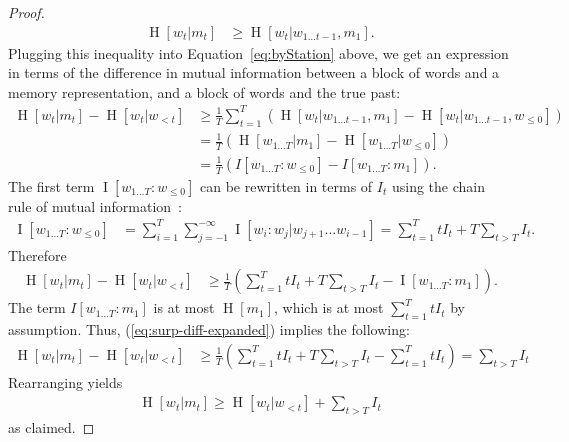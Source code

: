 \documentclass[11pt,letterpaper]{article}
\begin{document}
\begin{proof}
\begin{align}
\operatorname{H}[w_t | m_t]& \geq \operatorname{H}[w_t|w_{1\dots t-1}, m_1]. 
\end{align}
Plugging this inequality into Equation~\ref{eq:byStation} above, we get an expression in terms of the difference in mutual information between a block of words and a memory representation, and a block of words and the true past:
\begin{align}\label{eq:plugged}
\operatorname{H}[w_t | m_t] - \operatorname{H}[w_t | w_{<t}]& \geq \frac{1}{T} \sum_{t=1}^T ( \operatorname{H}[w_t|w_{1\dots t-1}, m_1] - \operatorname{H}[w_t | w_{1\dots t-1}, w_{\leq 0}]  )    \\
& = \frac{1}{T} \left(\operatorname{H}[w_{1\dots T} | m_1] - \operatorname{H}[w_{1\dots T} | w_{\leq 0}]\right)  \\
& = \frac{1}{T} \left(I[w_{1\dots T}: w_{\leq 0}] - I[w_{1\dots T}: m_1]\right).
\end{align}
	The first term $\operatorname{I}[w_{1\dots T}: w_{\leq 0}]$ can be rewritten in terms of $I_t$ using the chain rule of mutual information~\citep{cover2006elements}:
\begin{align}\label{eq:i-expanded}
	\operatorname{I}[w_{1\dots T}: w_{\leq 0}] &= \sum_{i=1}^T \sum_{j=-1}^{-\infty} \operatorname{I}[w_i: w_j | w_{j+1}...w_{i-1}] = \sum_{t=1}^T t I_t + T \sum_{t > T} I_t.
\end{align}
Therefore
\begin{align}\label{eq:surp-diff-expanded}
\operatorname{H}[w_t | m_t] - \operatorname{H}[w_t | w_{<t}]& \geq \frac{1}{T} \left(\sum_{t=1}^T t I_t + T \sum_{t > T} I_t - \operatorname{I}[w_{1\dots T}: m_1]\right).
\end{align}
The term $I[w_{1\dots T}:m_1]$ is at most $\operatorname{H}[m_1]$, which is at most $\sum_{t=1}^T t I_t$ by assumption. Thus,  (\ref{eq:surp-diff-expanded}) implies the following:
\begin{align}\label{eq:bounding-by-mem}
\operatorname{H}[w_t | m_t] - \operatorname{H}[w_t | w_{<t}]& \geq \frac{1}{T} \left(\sum_{t=1}^T t I_t + T \sum_{t > T} I_t - \sum_{t=1}^T t I_t\right) = \sum_{t > T} I_t
\end{align}
Rearranging yields
\begin{align}
\operatorname{H}[w_t|m_t] \geq \operatorname{H}[w_t | w_{<t}] + \sum_{t > T} I_t
\end{align}
as claimed.
\end{proof}

\end{document}
